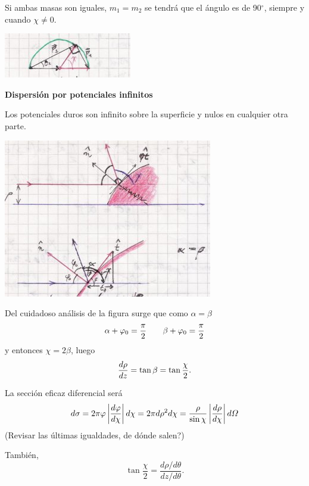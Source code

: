 \documentclass[10pt,oneside]{CBFT_book}
\begin{document}
Si ambas masas son iguales, $m_1 = m_2$ se tendrá que el ángulo es de 90$^\circ$, siempre y cuando
$\chi \neq 0$.

\includegraphics[scale=0.5]{images/fig_mc_dispersion_scatt_circulo_iguales.jpg}

\begin{ejemplo}{\bf Dispersión por potenciales infinitos}
 
Los potenciales duros son infinito sobre la superficie y nulos en cualquier otra parte.
 
\includegraphics[scale=0.5]{images/fig_mc_dispersion_potencial_infinito.jpg} 

Del cuidadoso análisis de la figura surge que como $ \alpha = \beta $
\[
	\alpha + \varphi_0 = \frac{\pi}{2} \qquad 
	\beta + \varphi_0 = \frac{\pi}{2}
\]
y entonces $\chi = 2 \beta$, luego 
\[
	\frac{d^{\hspace{-0.05em}} {\rho}}{d {z}^{\hspace{-0.05em}}} = \tan \beta = \tan \frac{\chi}{2}.
\]

La sección eficaz diferencial será
\[
	d\sigma = 2 \pi \varphi \left| \frac{d^{\hspace{-0.05em}} {\varphi}}{d {\chi}^{\hspace{-0.05em}}} \right| d\chi = 2 \pi d\rho^2 d\chi 
	= \frac{ \rho }{ \sin \chi }\left| \frac{d^{\hspace{-0.05em}} {\rho}}{d {\chi}^{\hspace{-0.05em}}} \right| d\Omega
\]
(Revisar las últimas igualdades, de dónde salen?)

También,
\[
	\tan \frac{\chi}{2} = \frac{ d\rho / d\theta }{ dz / d\theta }.
\]
 
\end{ejemplo}
\end{document}
